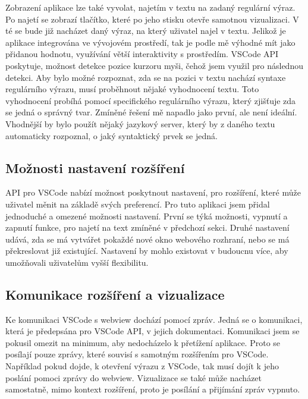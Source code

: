 Zobrazení aplikace lze také vyvolat, najetím v textu na zadaný regulární výraz.
Po najetí se zobrazí tlačítko, které po jeho stisku otevře samotnou vizualizaci.
V té se bude již nacházet daný výraz, na který uživatel najel v textu.
Jelikož je aplikace integrována ve vývojovém prostředí, tak je podle mě výhodné mít jako přidanou hodnotu, využívání větší interaktivity s prostředím.
VSCode API poskytuje, možnost detekce pozice kurzoru myši, čehož jsem využil pro následnou detekci.
Aby bylo možné rozpoznat, zda se na pozici v textu nachází syntaxe regulárního výrazu, musí proběhnout nějaké vyhodnocení textu.
Toto vyhodnocení probíhá pomocí specifického regulárního výrazu, který zjišťuje zda se jedná o správný tvar.
Zmíněné řešení mě napadlo jako první, ale není ideální.
Vhodnější by bylo použít nějaký jazykový server, který by z daného textu automaticky rozpoznal, o jaký syntaktický prvek se jedná.

\subsection*{Možnosti nastavení rozšíření}

API pro VSCode nabízí možnost poskytnout nastavení, pro rozšíření, které může uživatel měnit na základě svých preferencí.
Pro tuto aplikaci jsem přidal jednoduché a omezené možnosti nastavení.
První se týká možnosti, vypnutí a zapnutí funkce, pro najetí na text zmíněné v předchozí sekci.
Druhé nastavení udává, zda se má vytvářet pokaždé nové okno webového rozhraní, nebo se má překreslovat již existující.
Nastavení by mohlo existovat v budoucnu více, aby umožňovali uživatelům vyšší flexibilitu. 


\subsection*{Komunikace rozšíření a vizualizace}

Ke komunikaci VSCode s webview dochází pomocí zpráv.
Jedná se o komunikaci, která je předepsána pro VSCode API, v jejich dokumentaci.
Komunikaci jsem se pokusil omezit na minimum, aby nedocházelo k přetížení aplikace.
Proto se posílají pouze zprávy, které souvisí s samotným rozšířením pro VSCode.
Například pokud dojde, k otevření výrazu z VSCode, tak musí dojít k jeho poslání pomoci zprávy do webview.
Vizualizace se také může nacházet samostatně, mimo kontext rozšíření, proto je posílání a přijímání zpráv vypnuto.

